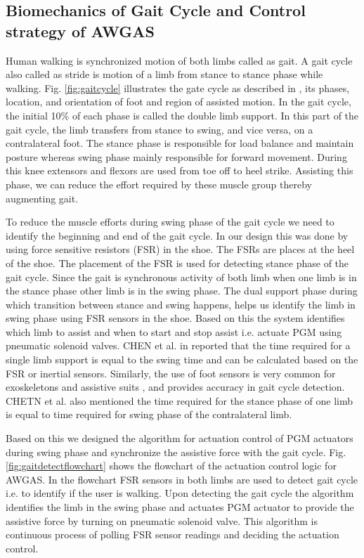 \documentclass[paper,JRM,paper]{jaciiiarticle}
\begin{document}

\subsection{Biomechanics of Gait Cycle and Control strategy of AWGAS}

Human walking is synchronized motion of both limbs called as gait. A gait cycle also called as stride is motion of a limb from stance to stance phase while walking. Fig. \ref{fig:gaitcycle} illustrates the gate cycle as described in \cite{15}, its phases, location, and orientation of foot and region of assisted motion. In the gait cycle, the initial 10\% of each phase is called the double limb support. In this part of the gait cycle, the limb transfers from stance to swing, and vice versa, on a contralateral foot. The stance phase is responsible for load balance and maintain posture whereas swing phase mainly responsible for forward movement. During this knee extensors and flexors are used from toe off to heel strike. Assisting this phase, we can reduce the effort required by these muscle group thereby augmenting gait. 

To reduce the muscle efforts during swing phase of the gait cycle we need to identify the beginning and end of the gait cycle. In our design this was done by using force sensitive resistors (FSR) in the shoe. The FSRs are places at the heel of the shoe. The placement of the FSR is used for detecting stance phase of the gait cycle. Since the gait is synchronous activity of both limb when one limb is in the stance phase other limb is in the swing phase. The dual support phase during which transition between stance and swing happens, helps us identify the limb in swing phase using FSR sensors in the shoe. Based on this the system identifies which limb to assist and when to start and stop assist i.e. actuate PGM using pneumatic solenoid valves. CHEN  et al. in \cite{16} reported that the time required for a single limb support is equal to the swing time and can be calculated based on the FSR or inertial sensors. Similarly, the use of foot sensors is very common for exoskeletons and assistive suits \cite{16,17,18,19,20,21}, and provides accuracy in gait cycle detection. CHETN et al. also mentioned the time required for the stance phase of one limb is equal to time required for swing phase of the contralateral limb.

Based on this we designed the algorithm for actuation control of PGM actuators during swing phase and synchronize the assistive force with the gait cycle. Fig. \ref{fig:gaitdetectflowchart} shows the flowchart of the actuation control logic for AWGAS. In the flowchart FSR sensors in both limbs are used to detect gait cycle i.e. to identify if the user is walking. Upon detecting the gait cycle the algorithm identifies the limb in the swing phase and actuates PGM actuator to provide the assistive force by turning on pneumatic solenoid valve. This algorithm is continuous process of polling FSR sensor readings and deciding the actuation control. 
\end{document}
